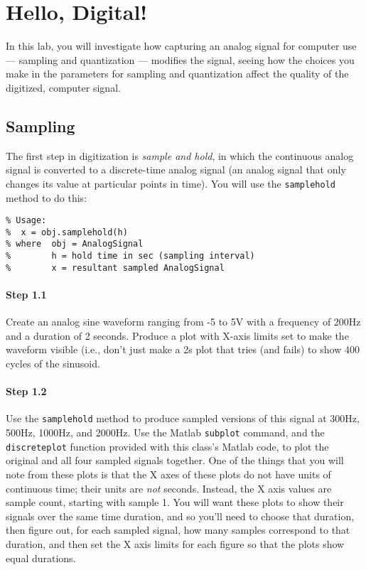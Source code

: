 
\section{Hello, Digital!}

In this lab, you will investigate how capturing an analog signal for
computer use --- sampling and quantization --- modifies the signal,
seeing how the choices you make in the parameters for sampling and
quantization affect the quality of the digitized, computer signal.

\subsection{Sampling}

The first step in digitization is \emph{sample and hold}, in which the
continuous analog signal is converted to a discrete-time analog signal
(an analog signal that only changes its value at particular points in
time). You will use the \texttt{samplehold} method to do this:
\begin{lstlisting}[style=Matlab-editor,basicstyle=\mlttfamily\small]
% samplehold Perform a sample and hold function on an AnalogSignal
% Usage:
%  x = obj.samplehold(h)
% where  obj = AnalogSignal
%        h = hold time in sec (sampling interval)
%        x = resultant sampled AnalogSignal
\end{lstlisting}

\paragraph{Step 1.1} Create an analog sine waveform ranging from -5 to
5V with a frequency of 200Hz and a duration of 2 seconds. Produce a
plot with X-axis limits set to make the waveform visible (i.e., don't
just make a 2s plot that tries (and fails) to show 400 cycles of the
sinusoid.

\paragraph{Step 1.2} Use the \texttt{samplehold} method to produce
sampled versions of this signal at 300Hz, 500Hz, 1000Hz, and
2000Hz. Use the Matlab \texttt{subplot} command, and the
\texttt{discreteplot} function provided with this class's Matlab code,
to plot the original and all four sampled signals together. One of the
things that you will note from these plots is that the X axes of these
plots do not have units of continuous time; their units are \emph{not}
seconds. Instead, the X axis values are sample count, starting with
sample 1. You will want these plots to show their signals over the
same time duration, and so you'll need to choose that duration,
then figure out, for each sampled signal, how many samples correspond
to that duration, and then set the X axis limits for each figure so
that the plots show equal durations.

